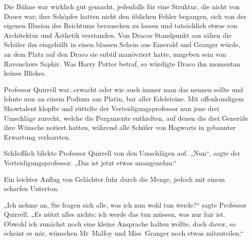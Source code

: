 Die Bühne war wirklich gut gemacht, jedenfalls für eine Struktur, die nicht von Dauer war; ihre Schöpfer hatten nicht den üblichen Fehler begangen, sich von der eigenen Illusion des Reichtums berauschen zu lassen und tatsächlich etwas von Architektur und Ästhetik verstanden. Von Dracos Standpunkt aus sähen die Schüler ihn eingehüllt in einen blassen Schein aus Emerald und Granger würde, an dem Platz auf den Draco sie subtil manövriert hatte, umgeben sein von Ravenclaws Saphir. Was Harry Potter betraf, so würdigte Draco ihn momentan keines Blickes.

Professor Quirrell war…erwacht oder wie auch immer man das nennen sollte und lehnte nun an einem Podium aus Platin, bar aller Edelsteine. Mit offenkundigem Showtalent klopfte und rüttelte der Verteidigungsprofessor nun jene drei Umschläge zurecht, welche die Pergamente enthielten, auf denen die drei Generäle ihre Wünsche notiert hatten, während alle Schüler von Hogwarts in gebannter Erwartung verharrten.

Schließlich blickte Professor Quirrell von den Umschlägen auf. „Nun“, sagte der Verteidigungsprofessor. „Das ist jetzt etwas unangenehm.“

Ein leichter Anflug von Gelächter fuhr durch die Menge, jedoch mit einem scharfen Unterton.

„Ich nehme an, Sie fragen sich alle, was ich nun wohl tun werde?“ sagte Professor Quirrell. „Es nützt alles nichts; ich werde das tun müssen, was nur fair ist. Obwohl ich zunächst noch eine kleine Ansprache halten wollte, doch davor, so scheint es mir, wünschen Mr~Malfoy und Miss~Granger noch etwas mitzuteilen.“

